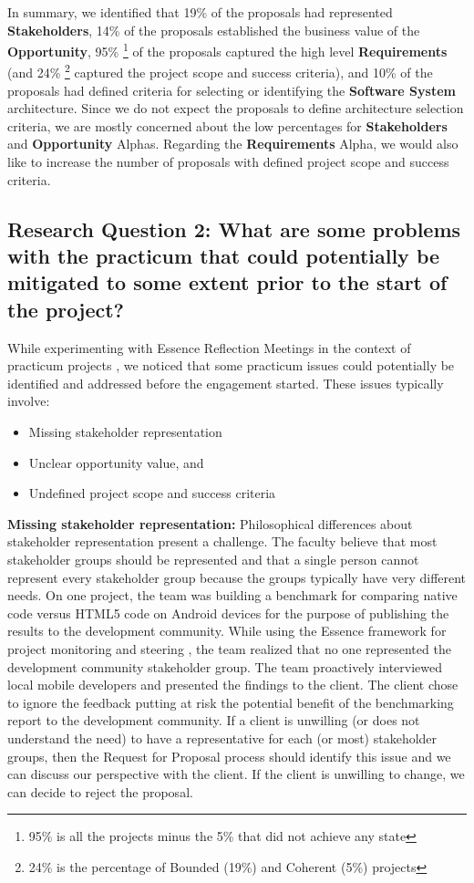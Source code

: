 In summary, we identified that 19\% of the proposals had represented
\textbf{Stakeholders}, 14\% of the proposals established the business value
of the \textbf{Opportunity}, 95\% \footnote{95\% is all the projects minus the 5\% that did not achieve any state} of the proposals captured the high level \textbf{Requirements} (and 24\% \footnote{24\% is the percentage of Bounded (19\%) and Coherent (5\%) projects} captured the project scope and success criteria), and 10\% of the proposals had defined criteria for selecting or identifying the \textbf{Software System} architecture. Since we do not expect the proposals to define architecture selection criteria, we are mostly concerned about the low
percentages for \textbf{Stakeholders} and \textbf{Opportunity} Alphas. Regarding
the \textbf{Requirements} Alpha, we would also like to increase the number of
proposals with defined project scope and success criteria.


\subsection{Research Question 2: What are some problems with the practicum that could potentially be mitigated to some extent prior to the start of the project?
}

While experimenting with Essence Reflection Meetings in the
context of practicum projects \cite{EASE2014, ICSE2014}, we
noticed that some practicum issues could potentially be identified and
addressed before the engagement started. These issues typically involve:

\begin{itemize}
\itemsep1pt\parskip0pt
\item
  Missing stakeholder representation
\item
  Unclear opportunity value, and
\item
  Undefined project scope and success criteria
\end{itemize}

\textbf{Missing stakeholder representation:} Philosophical differences about
stakeholder representation present a challenge. The faculty believe that
most stakeholder groups should be represented and that a single
person cannot represent every stakeholder group because the groups
typically have very different needs. On one project, the team was building
a benchmark for comparing native code versus HTML5 code
on Android devices for the purpose of publishing the results to the
development community. While using the Essence framework for project
monitoring and steering \cite{ICSE2014}, the team
realized that no one represented the development community stakeholder
group. The team proactively interviewed local mobile developers and
presented the findings to the client. The client chose to ignore the
feedback putting at risk the potential benefit of the benchmarking
report to the development community. If a client is unwilling (or does
not understand the need) to have a representative for each (or most)
stakeholder groups, then the Request for Proposal process should
identify this issue and we can discuss our perspective with the client. If
the client is unwilling to change, we can decide to reject the
proposal.

